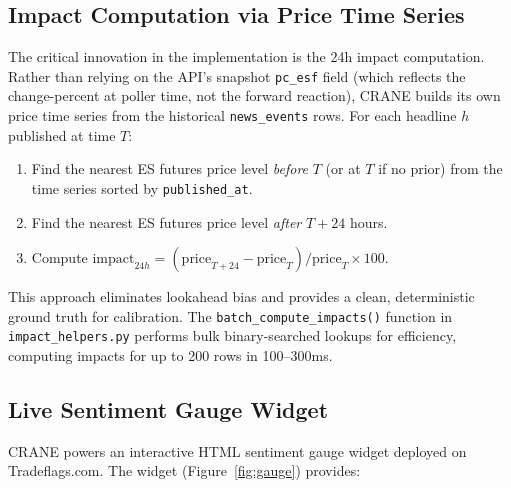 \subsection{Impact Computation via Price Time Series}

The critical innovation in the implementation is the 24h impact computation. Rather than relying on the API's snapshot \texttt{pc\_esf} field (which reflects the change-percent at poller time, not the forward reaction), CRANE builds its own price time series from the historical \texttt{news\_events} rows. For each headline $h$ published at time $T$:

\begin{enumerate}
    \item Find the nearest ES futures price level \emph{before} $T$ (or at $T$ if no prior) from the time series sorted by \texttt{published\_at}.
    \item Find the nearest ES futures price level \emph{after} $T + 24$ hours.
    \item Compute $\text{impact}_{24h} = (\text{price}_{T+24} - \text{price}_T) / \text{price}_T \times 100$.
\end{enumerate}

This approach eliminates lookahead bias and provides a clean, deterministic ground truth for calibration. The \texttt{batch\_compute\_impacts()} function in \texttt{impact\_helpers.py} performs bulk binary-searched lookups for efficiency, computing impacts for up to 200 rows in 100--300ms.

\subsection{Live Sentiment Gauge Widget}
\label{sec:widget}

CRANE powers an interactive HTML sentiment gauge widget deployed on Tradeflags.com. The widget (Figure~\ref{fig:gauge}) provides:


